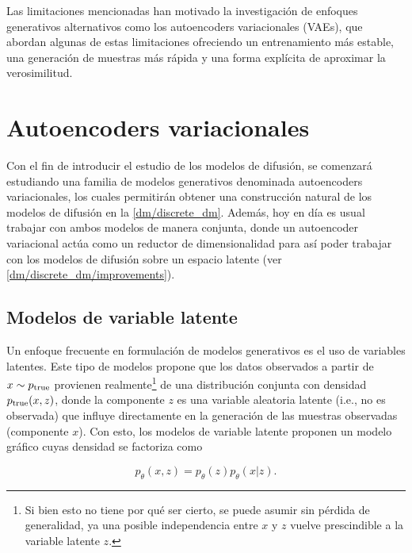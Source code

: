 Las limitaciones mencionadas han motivado la investigación de enfoques generativos alternativos como los autoencoders variacionales (VAEs), que abordan algunas de estas limitaciones ofreciendo un entrenamiento más estable, una generación de muestras más rápida y una forma explícita de aproximar la verosimilitud.

\section{Autoencoders variacionales}
\label{dm/vae}

Con el fin de introducir el estudio de los modelos de difusión, se comenzará estudiando una familia de modelos generativos denominada autoencoders variacionales, los cuales permitirán obtener una construcción natural de los modelos de difusión en la \autoref{dm/discrete_dm}. Además, hoy en día es usual trabajar con ambos modelos de manera conjunta, donde un autoencoder variacional actúa como un reductor de dimensionalidad para así poder trabajar con los modelos de difusión sobre un espacio latente (ver \autoref{dm/discrete_dm/improvements}).

\subsection{Modelos de variable latente}
\label{dm/vae/latent_models}

Un enfoque frecuente en formulación de modelos generativos es el uso de variables latentes. Este tipo de modelos propone que los datos observados a partir de $x\sim p_{\operatorname{true}}$ provienen realmente\footnote{Si bien esto no tiene por qué ser cierto, se puede asumir sin pérdida de generalidad, ya una posible independencia entre $x$ y $z$ vuelve prescindible a la variable latente $z$.} de una distribución conjunta con densidad $p_{\operatorname{true}}(x,z)$, donde la componente $z$ es una variable aleatoria latente (i.e., no es observada) que influye directamente en la generación de las muestras observadas (componente $x$). Con esto, los modelos de variable latente proponen un modelo gráfico cuyas densidad se factoriza como

\begin{equation}
    \label{eq:latent_model}
    p_\theta(x,z)=p_\theta(z)p_\theta(x|z).
\end{equation}

